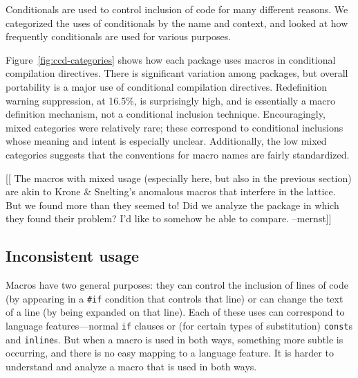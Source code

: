 \documentclass[10pt]{article}
\begin{document}
Conditionals are used to control inclusion of code for many different
reasons.  We categorized the uses of conditionals by the name and
context, and looked at how frequently conditionals are used for various
purposes.

{}

Figure~\ref{fig:ccd-categories} shows how each package uses macros in
conditional compilation directives.  There is significant variation
among packages, but overall portability is a major use of conditional
compilation directives.  Redefinition warning suppression, at 16.5\%, is
surprisingly high, and is essentially a macro definition mechanism, not
a conditional inclusion technique.  Encouragingly, mixed categories were
relatively rare; these correspond to conditional inclusions whose
meaning and intent is especially unclear.  Additionally, the low mixed
categories suggests that the conventions for macro names are fairly
standardized.

[[ The macros with mixed usage (especially here, but also in the
previous section) are akin to Krone \& Snelting's anomalous macros that
interfere in the lattice.  But we found more than they seemed to!  Did
we analyze the package in which they found their problem?  I'd like to
somehow be able to compare. --mernst]]
      

\subsection{Inconsistent usage}

Macros have two general purposes: they can control the inclusion of
lines of code (by appearing in a \texttt{\#if} condition that controls
that line) or can change the text of a line (by being expanded on that
line).  Each of these uses can correspond to language features---normal
\texttt{if} clauses or (for certain types of substitution) {\tt const}s
and {\tt inline}s.  But when a macro is used in both ways, something
more subtle is occurring, and there is
no easy mapping to a language feature.  It is harder to understand
and analyze a macro that is used in both ways.
\end{document}
